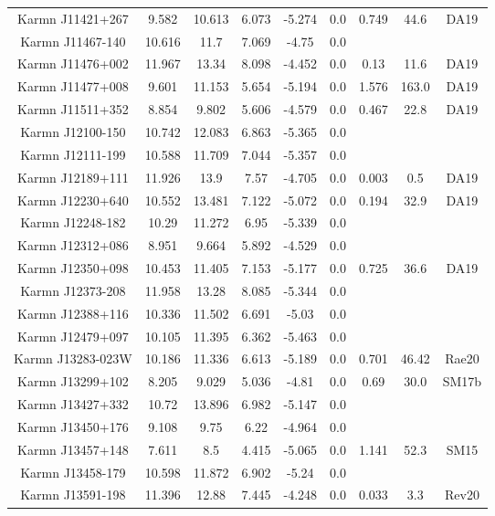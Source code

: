 \begin{longtable}{ccccccccc}
    Karmn J11421+267 & 9.582 & 10.613 & 6.073 & -5.274 & 0.0 & 0.749 & 44.6 & DA19 \\
    Karmn J11467-140 & 10.616 & 11.7 & 7.069 & -4.75 & 0.0 &  &  &  \\
    Karmn J11476+002 & 11.967 & 13.34 & 8.098 & -4.452 & 0.0 & 0.13 & 11.6 & DA19 \\
    Karmn J11477+008 & 9.601 & 11.153 & 5.654 & -5.194 & 0.0 & 1.576 & 163.0 & DA19 \\
    Karmn J11511+352 & 8.854 & 9.802 & 5.606 & -4.579 & 0.0 & 0.467 & 22.8 & DA19 \\
    Karmn J12100-150 & 10.742 & 12.083 & 6.863 & -5.365 & 0.0 &  &  &  \\
    Karmn J12111-199 & 10.588 & 11.709 & 7.044 & -5.357 & 0.0 &  &  &  \\
    Karmn J12189+111 & 11.926 & 13.9 & 7.57 & -4.705 & 0.0 & 0.003 & 0.5 & DA19 \\
    Karmn J12230+640 & 10.552 & 13.481 & 7.122 & -5.072 & 0.0 & 0.194 & 32.9 & DA19 \\
    Karmn J12248-182 & 10.29 & 11.272 & 6.95 & -5.339 & 0.0 &  &  &  \\
    Karmn J12312+086 & 8.951 & 9.664 & 5.892 & -4.529 & 0.0 &  &  &  \\
    Karmn J12350+098 & 10.453 & 11.405 & 7.153 & -5.177 & 0.0 & 0.725 & 36.6 & DA19 \\
    Karmn J12373-208 & 11.958 & 13.28 & 8.085 & -5.344 & 0.0 &  &  &  \\
    Karmn J12388+116 & 10.336 & 11.502 & 6.691 & -5.03 & 0.0 &  &  &  \\
    Karmn J12479+097 & 10.105 & 11.395 & 6.362 & -5.463 & 0.0 &  &  &  \\
    Karmn J13283-023W & 10.186 & 11.336 & 6.613 & -5.189 & 0.0 & 0.701 & 46.42 & Rae20 \\
    Karmn J13299+102 & 8.205 & 9.029 & 5.036 & -4.81 & 0.0 & 0.69 & 30.0 & SM17b \\
    Karmn J13427+332 & 10.72 & 13.896 & 6.982 & -5.147 & 0.0 &  &  &  \\
    Karmn J13450+176 & 9.108 & 9.75 & 6.22 & -4.964 & 0.0 &  &  &  \\
    Karmn J13457+148 & 7.611 & 8.5 & 4.415 & -5.065 & 0.0 & 1.141 & 52.3 & SM15 \\
    Karmn J13458-179 & 10.598 & 11.872 & 6.902 & -5.24 & 0.0 &  &  &  \\
    Karmn J13591-198 & 11.396 & 12.88 & 7.445 & -4.248 & 0.0 & 0.033 & 3.3 & Rev20 \\

\end{longtable}
